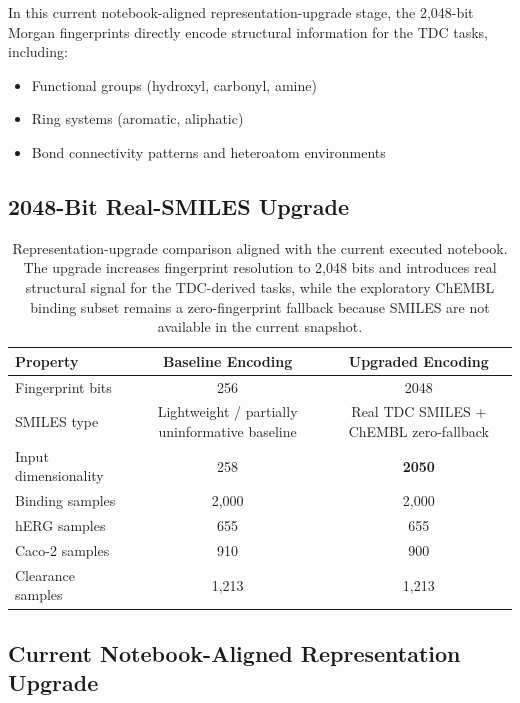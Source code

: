 \documentclass[a4paper,11pt,twoside]{report}
\begin{document}
In this current notebook-aligned representation-upgrade stage, the 2,048-bit Morgan fingerprints directly encode structural information for the TDC tasks, including:
\begin{itemize}
  \item Functional groups (hydroxyl, carbonyl, amine)
  \item Ring systems (aromatic, aliphatic)
  \item Bond connectivity patterns and heteroatom environments
\end{itemize}

\subsection{2048-Bit Real-SMILES Upgrade}

\begin{table}[htbp]
\centering
\small
\caption{Representation-upgrade comparison aligned with the current executed notebook. The upgrade increases fingerprint resolution to 2,048 bits and introduces real structural signal for the TDC-derived tasks, while the exploratory ChEMBL binding subset remains a zero-fingerprint fallback because SMILES are not available in the current snapshot.}
\label{tab:sec13_upgrade}
\begin{tabular}{l|c|c}
\hline
\textbf{Property} & \textbf{Baseline Encoding} & \textbf{Upgraded Encoding} \\
\hline
Fingerprint bits & 256 & 2048 \\
SMILES type & Lightweight / partially uninformative baseline & Real TDC SMILES + ChEMBL zero-fallback \\
Input dimensionality & 258 & \textbf{2050} \\
Binding samples & 2,000 & 2,000 \\
hERG samples & 655 & 655 \\
Caco-2 samples & 910 & 900 \\
Clearance samples & 1,213 & 1,213 \\
\hline
\end{tabular}
\end{table}

\subsection{Current Notebook-Aligned Representation Upgrade}
\end{document}
